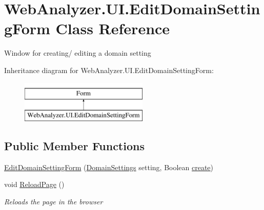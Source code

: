 \hypertarget{class_web_analyzer_1_1_u_i_1_1_edit_domain_setting_form}{}\section{Web\+Analyzer.\+U\+I.\+Edit\+Domain\+Setting\+Form Class Reference}
\label{class_web_analyzer_1_1_u_i_1_1_edit_domain_setting_form}


Window for creating/ editing a domain setting  


Inheritance diagram for Web\+Analyzer.\+U\+I.\+Edit\+Domain\+Setting\+Form\+:\begin{figure}[H]
\begin{center}
\leavevmode
\includegraphics[height=2.000000cm]{class_web_analyzer_1_1_u_i_1_1_edit_domain_setting_form}
\end{center}
\end{figure}
\subsection*{Public Member Functions}
\begin{DoxyCompactItemize}
\item 
\hyperlink{class_web_analyzer_1_1_u_i_1_1_edit_domain_setting_form_ac767a0df7b213a4871dd99c1d7d1d8a0}{Edit\+Domain\+Setting\+Form} (\hyperlink{class_web_analyzer_1_1_models_1_1_settings_model_1_1_domain_settings}{Domain\+Settings} setting, Boolean \hyperlink{_u_i_2_h_t_m_l_resources_2js_2lib_2underscore_8min_8js_a8bd5981157799459d39a59e8c4a0de04}{create})
\item 
void \hyperlink{class_web_analyzer_1_1_u_i_1_1_edit_domain_setting_form_afdf2612e1744f20b842785be8e901c01}{Reload\+Page} ()
\begin{DoxyCompactList}\small\item\em Reloads the page in the browser \end{DoxyCompactList}\end{DoxyCompactItemize}
